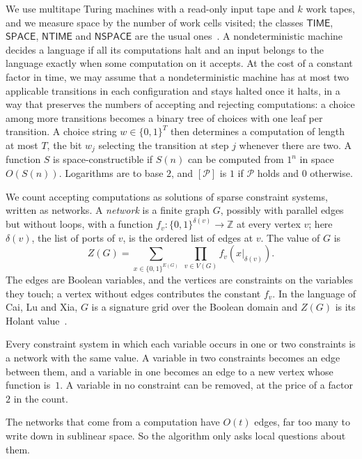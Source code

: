\documentclass[11pt]{article}
\theoremstyle{definition}
\theoremstyle{definition}
\theoremstyle{remark}
\newcommand{\NTIME}{\mathsf{NTIME}}
\newcommand{\TIME}{\mathsf{TIME}}
\newcommand{\SPACE}{\mathsf{SPACE}}
\newcommand{\NSPACE}{\mathsf{NSPACE}}
\newcommand{\Z}{\mathbb{Z}}
\begin{document}
We use multitape Turing machines with a read-only input tape and $k$ work tapes, and we measure space by the number of work cells visited; the classes $\TIME$, $\SPACE$, $\NTIME$ and $\NSPACE$ are the usual ones~\cite{AB09}. A nondeterministic machine decides a language if all its computations halt and an input belongs to the language exactly when some computation on it accepts. At the cost of a constant factor in time, we may assume that a nondeterministic machine has at most two applicable transitions in each configuration and stays halted once it halts, in a way that preserves the numbers of accepting and rejecting computations: a choice among more transitions becomes a binary tree of choices with one leaf per transition. A choice string $w\in\{0,1\}^T$ then determines a computation of length at most $T$, the bit $w_j$ selecting the transition at step $j$ whenever there are two. A function $S$ is space-constructible if $S(n)$ can be computed from $1^n$ in space $O(S(n))$. Logarithms are to base $2$, and $[\mathcal P]$ is $1$ if $\mathcal P$ holds and $0$ otherwise.

We count accepting computations as solutions of sparse constraint systems, written as networks. A \emph{network} is a finite graph $G$, possibly with parallel edges but without loops, with a function $f_v\colon\{0,1\}^{\delta(v)}\to\Z$ at every vertex $v$; here $\delta(v)$, the list of ports of $v$, is the ordered list of edges at $v$. The value of $G$ is
\[
Z(G)=\sum_{x\in\{0,1\}^{E(G)}}\ \prod_{v\in V(G)}f_v(x|_{\delta(v)}).
\]
The edges are Boolean variables, and the vertices are constraints on the variables they touch; a vertex without edges contributes the constant $f_v$. In the language of Cai, Lu and Xia, $G$ is a signature grid over the Boolean domain and $Z(G)$ is its Holant value~\cite{CLX09}.

Every constraint system in which each variable occurs in one or two constraints is a network with the same value. A variable in two constraints becomes an edge between them, and a variable in one becomes an edge to a new vertex whose function is~$1$. A variable in no constraint can be removed, at the price of a factor $2$ in the count.

The networks that come from a computation have $O(t)$ edges, far too many to write down in sublinear space. So the algorithm only asks local questions about them.
\end{document}
